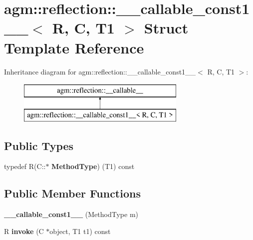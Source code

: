 \hypertarget{structagm_1_1reflection_1_1____callable__const1____}{}\section{agm\+:\+:reflection\+:\+:\+\_\+\+\_\+callable\+\_\+const1\+\_\+\+\_\+$<$ R, C, T1 $>$ Struct Template Reference}
\label{structagm_1_1reflection_1_1____callable__const1____}
Inheritance diagram for agm\+:\+:reflection\+:\+:\+\_\+\+\_\+callable\+\_\+const1\+\_\+\+\_\+$<$ R, C, T1 $>$\+:\begin{figure}[H]
\begin{center}
\leavevmode
\includegraphics[height=2.000000cm]{structagm_1_1reflection_1_1____callable__const1____}
\end{center}
\end{figure}
\subsection*{Public Types}
\begin{DoxyCompactItemize}
\item 
typedef R(C\+::$\ast$ {\bfseries Method\+Type}) (T1) const \hypertarget{structagm_1_1reflection_1_1____callable__const1_____ab3096d5b717b6e10882691c6d566f792}{}\label{structagm_1_1reflection_1_1____callable__const1_____ab3096d5b717b6e10882691c6d566f792}

\end{DoxyCompactItemize}
\subsection*{Public Member Functions}
\begin{DoxyCompactItemize}
\item 
{\bfseries \+\_\+\+\_\+callable\+\_\+const1\+\_\+\+\_\+} (Method\+Type m)\hypertarget{structagm_1_1reflection_1_1____callable__const1_____a8af033e8eeb669cb95713a16d05078d6}{}\label{structagm_1_1reflection_1_1____callable__const1_____a8af033e8eeb669cb95713a16d05078d6}

\item 
R {\bfseries invoke} (C $\ast$object, T1 t1) const \hypertarget{structagm_1_1reflection_1_1____callable__const1_____abe5ac3851ed17559bbfc92f47ab8a666}{}\label{structagm_1_1reflection_1_1____callable__const1_____abe5ac3851ed17559bbfc92f47ab8a666}

\end{DoxyCompactItemize}
